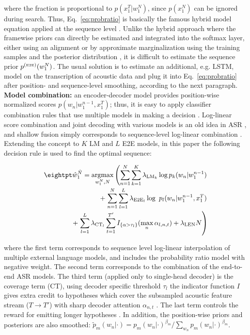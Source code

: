 \documentclass[a4paper]{article}
\begin{document}
\noindent where the fraction is proportional to $p(x^T_1|w_1^N)$, since $p(x_1^N)$ can be ignored during search.
Thus, Eq.~\ref{eq:probratio} is basically the famous hybrid model equation applied at the sequence level \cite{Bourlard1993}.
Unlike the hybrid approach where the framewise priors can directly be estimated and integrated into the softmax layer, either using an alignment or by approximate marginalization using the training samples and the posterior distribution \cite{Manohar2015}, it is difficult to estimate the sequence prior $p^{(\text{\tiny E2E})}(w_1^N)$.
The usual solution is to estimate an additional, e.g. LSTM, model on the transcription of acoustic data and plug it into Eq.~\ref{eq:probratio} after position- and sequence-level smoothing, according to the next paragraph.
\\ {\bf Model combination:}
an encoder-decoder model provides position-wise normalized scores $p(w_n|w_1^{n-1},x_1^T)$; thus, it is easy to apply classifier combination rules that use multiple models in making a decision \cite{Kittler1998,Kirchhoff2000}.
Log-linear score combination and joint decoding with various models is an old idea in ASR \cite{Dugast1994}, and shallow fusion simply corresponds to sequence-level log-linear combination \cite{GulcehreFXCBLBS15}.
Extending the concept to $K$ LM and $L$ E2E models, in this paper the following decision rule is used to find the optimal sequence:

\vspace{-5mm}
\begin{align}
  \eightpt
  \hat{w}_1^{\hat{N}} = \argmax\limits_{w_1^N,N} \left( \sum_{n=1}^{N} \sum_{k=1}^{K}\lambda_{\text{LM}_k} \log p_k(w_n|w_1^{n-1}) \right . \nonumber \\[-0.1em]
   + \left. \sum_{n=1}^{N} \sum_{l=1}^{L} \lambda_{\text{E2E}_l} \log\ p_l(w_n|w_1^{n-1},x_1^T)  \right. \label{eq:combo} \\[-0.1em]
  + \left. \sum_{l=1}^{L} \lambda_{\text{CT}_l} \sum_{t=1}^{T'} I_{\{ \alpha > \tau_l \}} (\max_n \alpha_{l,n,t}) +  \lambda_{\text{LEN}}N \right) \nonumber
\end{align}
\vspace{-2mm}

\noindent where the first term corresponds to sequence level log-linear interpolation of multiple external language models, and includes the probability ratio model with negative weight.
The second term corresponds to the combination of the end-to-end ASR models.
The third term (applied only to single-head decoder) is the coverage term (CT), using decoder specific threshold $\tau_l$ the indicator function $I$ gives extra credit to hypotheses which cover the subsampled acoustic feature stream ($T\rightarrow T'$) with sharp decoder attention $\alpha_{n,t}$ \cite{ChorowskiJ16,Tu2016}.
The last term controls the reward for emitting longer hypotheses \cite{Hannun14}.
In addition, the position-wise priors and posteriors are also smoothed: $\tilde{p}_m(w_n|\cdot) = p_m(w_n|\cdot)^{\beta_m} / \sum_{w_n} p_m(w_n|\cdot)^{\beta_m}$.
\end{document}
